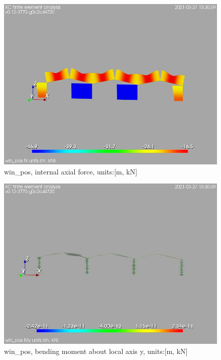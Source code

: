 \begin{figure}
\begin{center}
\includegraphics[width=\linewidth]{calc_results/sole_zeinali/text/graphics/resSimplLC/win_posallMemberSetN}
\caption{win_pos, internal axial force, units:[m, kN]}
\end{center}
\end{figure}
\begin{figure}
\begin{center}
\includegraphics[width=\linewidth]{calc_results/sole_zeinali/text/graphics/resSimplLC/win_posallMemberSetMy}
\caption{win_pos, bending moment about local axis y, units:[m, kN]}
\end{center}
\end{figure}
